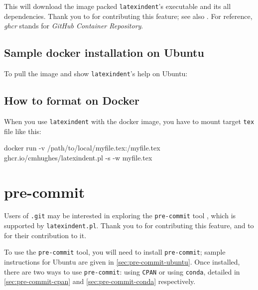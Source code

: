   This will download the image packed \texttt{latexindent}'s executable and its all
  dependencies.  Thank you to \cite{eggplants} for contributing this feature;
  see also \cite{cmhughesio}. For reference, \emph{ghcr} stands for \emph{GitHub Container
  Repository}.

 \subsection{Sample docker installation on Ubuntu}
  To pull the image and show \texttt{latexindent}'s help on Ubuntu:


 \subsection{How to format on Docker}
  When you use \texttt{latexindent} with the docker image, you have to mount target \texttt{tex} file like this:

  \begin{commandshell}
docker run -v /path/to/local/myfile.tex:/myfile.tex ghcr.io/cmhughes/latexindent.pl -s -w myfile.tex
\end{commandshell}

 \section{pre-commit}

  Users of \texttt{.git} may be interested  in exploring the \texttt{pre-commit} tool \cite{pre-commithome}, which is
  supported by \texttt{latexindent.pl}. Thank you to \cite{tdegeusprecommit} for
  contributing this feature, and to \cite{holzhausprecommit} for their contribution to it.

  To use the \texttt{pre-commit} tool, you will need to install \texttt{pre-commit}; sample
  instructions for Ubuntu are given in \cref{sec:pre-commit-ubuntu}. Once installed, there
  are two ways to use \texttt{pre-commit}: using \texttt{CPAN} or using \texttt{conda},
  detailed in \cref{sec:pre-commit-cpan} and \cref{sec:pre-commit-conda} respectively.

